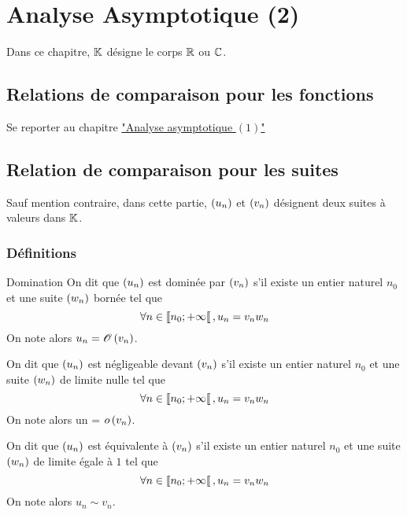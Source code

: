 \chapter{Analyse Asymptotique (2)}

\minitoc

Dans ce chapitre, \(\mathbb{K}\) désigne le corps \(\mathbb{R}\) ou \(\mathbb{C}\).

\section{Relations de comparaison pour les fonctions}
    Se reporter au chapitre \hyperref[chap:analyse-asymptotique1]{"Analyse asymptotique \((1)\)"}
\section{Relation de comparaison pour les suites}
    Sauf mention contraire, dans cette partie, \(\left(u_n\right)\) et \(\left(v_n\right)\) désignent deux suites à valeurs dans \(\mathbb{K}\).
\subsection{Définitions}
\begin{defprop}{Domination}
    On dit que \(\left(u_n\right)\) est dominée par \(\left(v_n\right)\) s’il existe un entier naturel \(n_0\) et une suite \(\left(w_n\right)\) bornée tel que
    \[\forall n \in \left\llbracket n_0;+\infty\right\llbracket , u_n = v_nw_n\]
    On note alors \(u_n = \mathscr{O}\left(v_n\right)\).
\end{defprop}
\begin{defprop}[Négligeabilité]
    On dit que \(\left(u_n\right)\) est négligeable devant \(\left(v_n\right)\) s’il existe un entier naturel \(n_0\) et une suite \(\left(w_n\right)\) de limite nulle tel que
    \[\forall n \in  \left\llbracket n_0;+\infty\right\llbracket   , u_n = v_nw_n\]
    On note alors un = \(o\left(v_n\right)\).  
\end{defprop}
\begin{defprop}[Equivalence]
    On dit que \(\left(u_n\right)\) est équivalente à \(\left(v_n\right)\) s’il existe un entier naturel \(n_0\) et une suite \(\left(w_n\right)\) de limite égale à \(1\) tel que
    \[\forall n \in  \left\llbracket n_0;+\infty\right\llbracket, u_n = v_nw_n\]
    On note alors \(u_n \sim v_n\).
\end{defprop}

